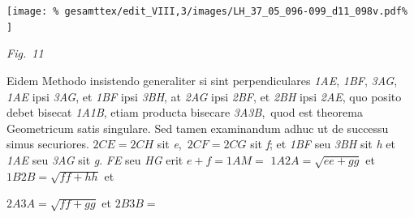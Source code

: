 \pend
%
%
\vspace{1.0em} %
\centerline{%
\texttt{[image: \%
gesamttex/edit\_VIII,3/images/LH\_37\_05\_096-099\_d11\_098v.pdf\%
]}} 
\vspace{0.5em}
\centerline{%
\lbrack\textit{Fig.~11}\rbrack%
}
\vspace{1em}
%
\pstart
%
Eidem Methodo insistendo generaliter si sint  
%
 perpendiculares \textit{{\scriptsize1}AE}, \textit{{\scriptsize1}BF}, \textit{{\scriptsize3}AG},  
%
%
 \textit{{\scriptsize1}AE} ipsi \textit{{\scriptsize3}AG}, et \textit{{\scriptsize1}BF} ipsi \textit{{\scriptsize3}BH}, at \textit{{\scriptsize2}AG} ipsi \textit{{\scriptsize2}BF}, et \textit{{\scriptsize2}BH} ipsi \textit{{\scriptsize2}AE}, quo posito debet   
%
%
bisecat \textit{{\scriptsize1}A{\scriptsize1}B}, etiam producta bisecare \textit{{\scriptsize3}A{\scriptsize3}B}\lbrack,\rbrack\ quod est theorema Geometricum satis singulare.\protect{}  
%
Sed tamen examinandum adhuc ut de successu simus securiores.
\pend
%
\pstart
${\scriptstyle \textit{2}}CE={\scriptstyle \textit{2}}CH$ sit \textit{e}\lbrack,\rbrack\ ${\scriptstyle \textit{2}}CF={\scriptstyle \textit{2}}CG$ sit \textit{f}; et \textit{{\scriptsize1}BF} seu \textit{{\scriptsize3}BH} sit \textit{h} et \textit{{\scriptsize1}AE} seu \textit{{\scriptsize3}AG} sit \textit{g}. 
%
\textit{FE} seu \textit{HG} erit $e+f={\scriptstyle \textit{1}}AM=$  
%
%
${\scriptstyle \textit{1}}A{\scriptstyle \textit{2}}A=\sqrt{ee+gg}$ et ${\scriptstyle \textit{1}}B{\scriptstyle \textit{2}}B=\sqrt{ff+hh}$ et 
\rule[0cm]{0mm}{14pt}${\scriptstyle \textit{2}}A{\scriptstyle \textit{3}}A=\sqrt{ff+gg}$ et ${\scriptstyle \textit{2}}B{\scriptstyle \textit{3}}B=$ 
%
